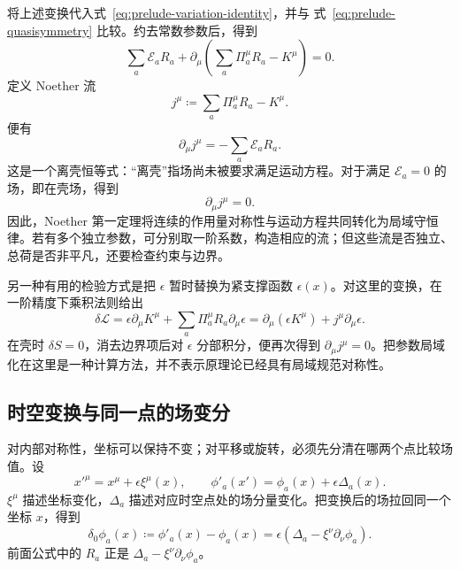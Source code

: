 将上述变换代入式~\eqref{eq:prelude-variation-identity}，并与
式~\eqref{eq:prelude-quasisymmetry} 比较。约去常数参数后，得到
\begin{equation}
  \sum_{a}\mathcal{E}_{a}R_{a}
  +\partial_{\mu}\left(\sum_{a}\Pi_{a}^{\mu}R_{a}-K^{\mu}\right)=0.
\end{equation}
定义 Noether 流
\begin{equation}
  \boxed{j^{\mu}\coloneqq\sum_{a}\Pi_{a}^{\mu}R_{a}-K^{\mu}.}
  \label{eq:prelude-noether-current}
\end{equation}
便有
\begin{equation}
  \partial_{\mu}j^{\mu}=-\sum_{a}\mathcal{E}_{a}R_{a}.
  \label{eq:prelude-offshell-noether}
\end{equation}
这是一个离壳恒等式：“离壳”指场尚未被要求满足运动方程。对于满足
$\mathcal{E}_{a}=0$ 的场，即在壳场，得到
\begin{equation}
  \boxed{\partial_{\mu}j^{\mu}=0.}
  \label{eq:prelude-continuity}
\end{equation}
因此，Noether 第一定理将连续的作用量对称性与运动方程共同转化为局域守恒律。若有多个独立参数，可分别取一阶系数，构造相应的流；但这些流是否独立、总荷是否非平凡，还要检查约束与边界。

另一种有用的检验方式是把 $\epsilon$ 暂时替换为紧支撑函数 $\epsilon(x)$。对这里的变换，在一阶精度下乘积法则给出
\begin{equation}
  \delta\mathcal{L}
  =\epsilon\partial_{\mu}K^{\mu}
    +\sum_{a}\Pi_{a}^{\mu}R_{a}\partial_{\mu}\epsilon
  =\partial_{\mu}(\epsilon K^{\mu})+j^{\mu}\partial_{\mu}\epsilon.
\end{equation}
在壳时 $\delta S=0$，消去边界项后对 $\epsilon$ 分部积分，便再次得到
$\partial_{\mu}j^{\mu}=0$。把参数局域化在这里是一种计算方法，并不表示原理论已经具有局域规范对称性。

\subsection{时空变换与同一点的场变分}

对内部对称性，坐标可以保持不变；对平移或旋转，必须先分清在哪两个点比较场值。设
\begin{equation}
  x'^{\mu}=x^{\mu}+\epsilon\xi^{\mu}(x),\qquad
  \phi'_{a}(x')=\phi_{a}(x)+\epsilon\Delta_{a}(x).
\end{equation}
$\xi^{\mu}$ 描述坐标变化，$\Delta_{a}$ 描述对应时空点处的场分量变化。把变换后的场拉回同一个坐标 $x$，得到
\begin{equation}
  \delta_{0}\phi_{a}(x)\coloneqq\phi'_{a}(x)-\phi_{a}(x)
  =\epsilon\left(\Delta_{a}-\xi^{\nu}\partial_{\nu}\phi_{a}\right).
\end{equation}
前面公式中的 $R_{a}$ 正是 $\Delta_{a}-\xi^{\nu}\partial_{\nu}\phi_{a}$。


